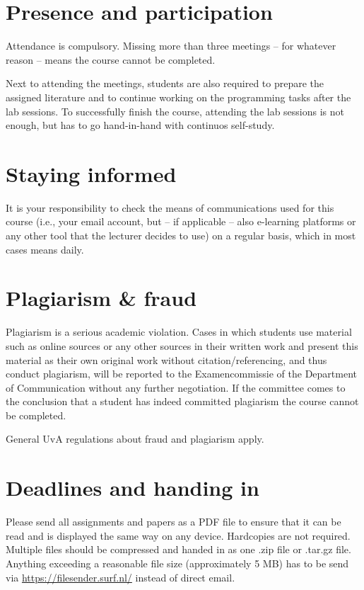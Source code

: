 \documentclass[a4paper,10pt]{report}
\begin{document}
\section{Presence and participation}
Attendance is compulsory. Missing more than three meetings – for whatever reason – means the course cannot be completed.

Next to attending the meetings, students are also required to prepare the assigned literature and to continue working on the programming tasks after the lab sessions. To successfully finish the course, attending the lab sessions is not enough, but has to go hand-in-hand with continuos self-study.

\section{Staying informed}
It is your responsibility to check the means of communications used for this course (i.e., your email account, but – if applicable – also e-learning platforms or any other tool that the lecturer decides to use) on a regular basis, which in most cases means daily.

\section{Plagiarism \& fraud}
Plagiarism is a serious academic violation. Cases in which students use material such as online sources or any other sources in their written work and present this material as their own original work without citation/referencing, and thus conduct plagiarism, will be reported to the Examencommissie of the Department of Communication without any further negotiation. If the committee comes to the conclusion that a student has indeed committed plagiarism the course cannot be completed. 

General UvA regulations about fraud and plagiarism apply.

\section{Deadlines and handing in}
Please send all assignments and papers as a PDF file to ensure that it can be read and is displayed the same way on any device. Hardcopies are not required. Multiple files should be compressed and handed in as one .zip file or .tar.gz file. Anything exceeding a reasonable file size (approximately 5 MB) has to be send via \url{https://filesender.surf.nl/} instead of direct email.
\end{document}
